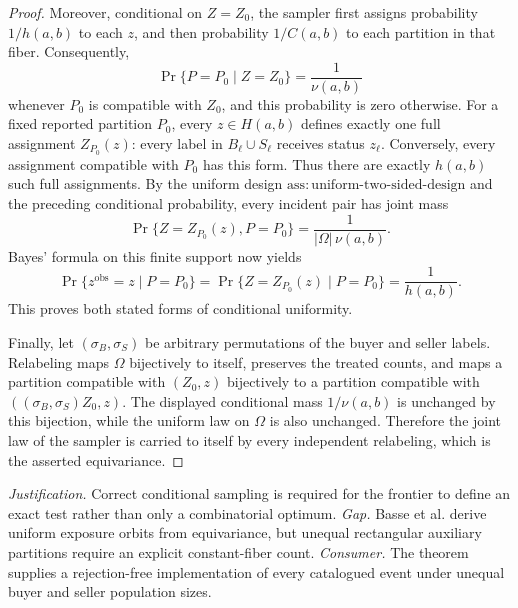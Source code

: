 \documentclass{article}
\begin{document}
\begin{proof}
Moreover, conditional on \(Z=Z_0\), the sampler first assigns probability \(1/h(a,b)\) to each \(z\), and then probability \(1/C(a,b)\) to each partition in that fiber.  Consequently,
\[
 \Pr\{P=P_0\mid Z=Z_0\}
 =\frac{1}{\nu(a,b)}
\]
whenever \(P_0\) is compatible with \(Z_0\), and this probability is zero otherwise.  For a fixed reported partition \(P_0\), every \(z\in H(a,b)\) defines exactly one full assignment \(Z_{P_0}(z)\): every label in \(B_\ell\cup S_\ell\) receives status \(z_\ell\).  Conversely, every assignment compatible with \(P_0\) has this form.  Thus there are exactly \(h(a,b)\) such full assignments.  By the uniform design \(\mathrm{ass{:}uniform\mbox{-}two\mbox{-}sided\mbox{-}design}\) and the preceding conditional probability, every incident pair has joint mass
\[
 \Pr\{Z=Z_{P_0}(z),P=P_0\}
 =\frac{1}{|\Omega|\,\nu(a,b)}.
\]
Bayes' formula on this finite support now yields
\[
 \Pr\{z^{\mathrm{obs}}=z\mid P=P_0\}
 =\Pr\{Z=Z_{P_0}(z)\mid P=P_0\}
 =\frac1{h(a,b)}.
\]
This proves both stated forms of conditional uniformity.

Finally, let \((\sigma_B,\sigma_S)\) be arbitrary permutations of the buyer and seller labels.  Relabeling maps \(\Omega\) bijectively to itself, preserves the treated counts, and maps a partition compatible with \((Z_0,z)\) bijectively to a partition compatible with \(((\sigma_B,\sigma_S)Z_0,z)\).  The displayed conditional mass \(1/\nu(a,b)\) is unchanged by this bijection, while the uniform law on \(\Omega\) is also unchanged.  Therefore the joint law of the sampler is carried to itself by every independent relabeling, which is the asserted equivariance.
\end{proof}
\par\smallskip\noindent \textit{Justification.} Correct conditional sampling is required for the frontier to define an exact test rather than only a combinatorial optimum. \textit{Gap.} Basse et al. derive uniform exposure orbits from equivariance, but unequal rectangular auxiliary partitions require an explicit constant-fiber count. \textit{Consumer.} The theorem supplies a rejection-free implementation of every catalogued event under unequal buyer and seller population sizes.
\end{document}
